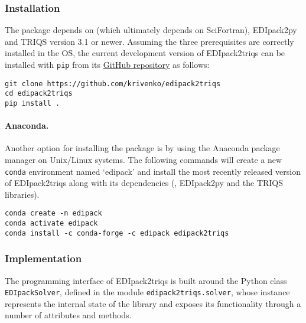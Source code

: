 \documentclass[edipack_sp.tex]{subfiles}
\begin{document}
\subsubsection{Installation}\label{sSecInteropTRIQSInstallation}
The package depends on \NAME (which ultimately depends on SciFortran), EDIpack2py
and TRIQS version 3.1 or newer. Assuming the three prerequisites are correctly 
installed in the OS, the current development version of EDIpack2triqs can be 
installed with {\tt pip} from its 
\href{https://github.com/krivenko/edipack2triqs}{GitHub repository} as follows:

\begin{lstlisting}[style=mybash]
git clone https://github.com/krivenko/edipack2triqs
cd edipack2triqs
pip install .
\end{lstlisting}

\paragraph{Anaconda.}
Another option for installing the package is by using the Anaconda package 
manager on Unix/Linux systems.
The following commands will create a new {\tt conda} environment named 
`edipack' and install the most recently released version of EDIpack2triqs along 
with its dependencies (\NAME, EDIpack2py and the TRIQS libraries).

\begin{lstlisting}[style=mybash]
conda create -n edipack
conda activate edipack
conda install -c conda-forge -c edipack edipack2triqs
\end{lstlisting}

\subsubsection{Implementation}\label{sSecInteropTRIQSImplementation}
The programming interface of EDIpack2triqs is built around the  
Python class {\tt EDIpackSolver}, defined in the module
{\tt edipack2triqs.solver}, whose instance represents the internal state of 
the \NAME library and exposes its functionality through a number of 
attributes and methods.
\end{document}
